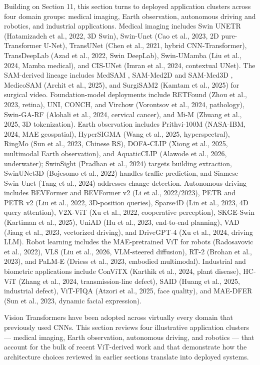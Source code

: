\documentclass{article}
\begin{document}
Building on Section 11, this section turns to deployed application clusters across four domain groups: medical imaging, Earth observation, autonomous driving and robotics, and industrial applications. Medical imaging includes Swin UNETR (Hatamizadeh et al., 2022, 3D Swin), Swin-Unet (Cao et al., 2023, 2D pure-Transformer U-Net), TransUNet (Chen et al., 2021, hybrid CNN-Transformer), TransDeepLab (Azad et al., 2022, Swin DeepLab), Swin-UMamba (Liu et al., 2024, Mamba medical), and CIS-UNet (Imran et al., 2024, contextual UNet). The SAM-derived lineage includes MedSAM \citep{ma2024segmentanythinginm}, SAM-Med2D and SAM-Med3D \citep{wang2025visiontransformers}, MedicoSAM (Archit et al., 2025), and SurgiSAM2 (Kamtam et al., 2025) for surgical video. Foundation-model deployments include RETFound (Zhou et al., 2023, retina), UNI, CONCH, and Virchow (Vorontsov et al., 2024, pathology), Swin-GA-RF (Alohali et al., 2024, cervical cancer), and Mi-M (Zhuang et al., 2025, 3D tokenization). Earth observation includes Prithvi-100M (NASA-IBM, 2024, MAE geospatial), HyperSIGMA (Wang et al., 2025, hyperspectral), RingMo (Sun et al., 2023, Chinese RS), DOFA-CLIP (Xiong et al., 2025, multimodal Earth observation), and AquaticCLIP (Alawode et al., 2026, underwater); SwinSight (Pradhan et al., 2024) targets building extraction, SwinUNet3D (Bojesomo et al., 2022) handles traffic prediction, and Siamese Swin-Unet (Tang et al., 2024) addresses change detection. Autonomous driving includes BEVFormer and BEVFormer v2 (Li et al., 2022/2023), PETR and PETR v2 (Liu et al., 2022, 3D-position queries), Sparse4D (Lin et al., 2023, 4D query attention), V2X-ViT (Xu et al., 2022, cooperative perception), SKGE-Swin (Kartiman et al., 2025), UniAD (Hu et al., 2023, end-to-end planning), VAD (Jiang et al., 2023, vectorized driving), and DriveGPT-4 (Xu et al., 2024, driving LLM). Robot learning includes the MAE-pretrained ViT for robots (Radosavovic et al., 2022), VLS (Liu et al., 2026, VLM-steered diffusion), RT-2 (Brohan et al., 2023), and PaLM-E (Driess et al., 2023, embodied multimodal). Industrial and biometric applications include ConViTX (Karthik et al., 2024, plant disease), HC-ViT (Zhang et al., 2024, transmission-line defect), SAID (Huang et al., 2025, industrial defect), ViT-FIQA (Atzori et al., 2025, face quality), and MAE-DFER (Sun et al., 2023, dynamic facial expression).

Vision Transformers have been adopted across virtually every domain that previously used CNNs. This section reviews four illustrative application clusters --- medical imaging, Earth observation, autonomous driving, and robotics --- that account for the bulk of recent ViT-derived work and that demonstrate how the architecture choices reviewed in earlier sections translate into deployed systems.
\end{document}
